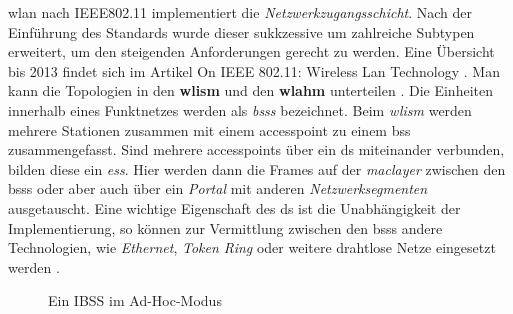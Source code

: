 \gls{wlan} nach IEEE802.11 implementiert die \textit{Netzwerkzugangsschicht}. Nach der Einführung des Standards wurde dieser sukkzessive um zahlreiche Subtypen erweitert, um den steigenden Anforderungen gerecht zu werden. Eine Übersicht bis 2013 findet sich im Artikel \glqq On IEEE 802.11: Wireless Lan Technology\grqq{} \cite{Banerji13}. Man kann die Topologien in den \textbf{\gls{wlism}} und den \textbf{\gls{wlahm}} unterteilen \cite{Crow97}. Die Einheiten innerhalb eines Funktnetzes werden als \textit{\glspl{bss}} bezeichnet. Beim \textit{\gls{wlism}} werden mehrere Stationen zusammen mit einem \gls{accesspoint} zu einem \gls{bss} zusammengefasst. Sind mehrere \glspl{accesspoint} über ein \gls{ds} miteinander verbunden, bilden diese ein \textit{\gls{ess}}. Hier werden dann die Frames auf der \textit{\gls{maclayer}} zwischen den \glspl{bss} oder aber auch über ein \textit{Portal} mit anderen \textit{Netzwerksegmenten} ausgetauscht. Eine wichtige Eigenschaft des \gls{ds} ist die Unabhängigkeit der Implementierung, so können zur Vermittlung zwischen den \glspl{bss} andere Technologien, wie \textit{Ethernet}, \textit{Token Ring} oder weitere drahtlose Netze eingesetzt werden \cite{Crow97}.\newline

\begin{figure}
  \centering
  \caption{Ein IBSS im Ad-Hoc-Modus}
\end{figure}

